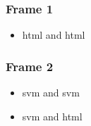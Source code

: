 \documentclass[12pt]{beamer}
\begin{document}
\begin{frame}
 \frametitle{Frame 1}
 \begin{itemize}
 \item \gls{html} and \gls{html}
 \end{itemize}
 \end{frame}
\GlsXtrStartUnsetBuffering
\GlsXtrUnsetBufferEnableRepeatLocal
\begin{frame}
\GlsXtrResetLocalBuffer
 \frametitle{Frame 2}
 \begin{itemize}
 \item<+-> \gls{svm} and \gls{svm}
 \item<+-> \gls{svm} and \gls{html}
 \end{itemize}
\end{frame}
\GlsXtrStopUnsetBuffering
\frame{\printunsrtglossaries} 
\end{document}
